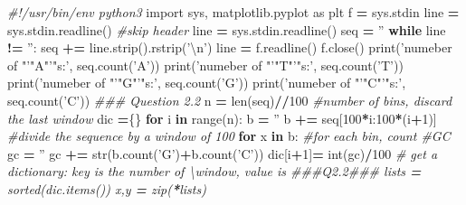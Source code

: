 \documentclass[]{article}
\newenvironment{Shaded}{\begin{snugshade}}{\end{snugshade}}
\newcommand{\KeywordTok}[1]{\textcolor[rgb]{0.13,0.29,0.53}{\textbf{#1}}}
\newcommand{\DecValTok}[1]{\textcolor[rgb]{0.00,0.00,0.81}{#1}}
\newcommand{\CharTok}[1]{\textcolor[rgb]{0.31,0.60,0.02}{#1}}
\newcommand{\StringTok}[1]{\textcolor[rgb]{0.31,0.60,0.02}{#1}}
\newcommand{\ImportTok}[1]{#1}
\newcommand{\CommentTok}[1]{\textcolor[rgb]{0.56,0.35,0.01}{\textit{#1}}}
\newcommand{\ControlFlowTok}[1]{\textcolor[rgb]{0.13,0.29,0.53}{\textbf{#1}}}
\newcommand{\OperatorTok}[1]{\textcolor[rgb]{0.81,0.36,0.00}{\textbf{#1}}}
\newcommand{\BuiltInTok}[1]{#1}
\newcommand{\NormalTok}[1]{#1}
\begin{document}
\begin{Shaded}
\begin{Highlighting}[]
\CommentTok{#!/usr/bin/env python3}
\ImportTok{import}\NormalTok{ sys, matplotlib.pyplot }\ImportTok{as}\NormalTok{ plt}
\NormalTok{f }\OperatorTok{=}\NormalTok{ sys.stdin}
\NormalTok{line }\OperatorTok{=}\NormalTok{ sys.stdin.readline() }\CommentTok{#skip header}
\NormalTok{line }\OperatorTok{=}\NormalTok{ sys.stdin.readline()}
\NormalTok{seq }\OperatorTok{=} \StringTok{''}
\ControlFlowTok{while}\NormalTok{ line }\OperatorTok{!=} \StringTok{''}\NormalTok{:}
\NormalTok{    seq }\OperatorTok{+=}\NormalTok{ line.strip().rstrip(}\StringTok{'}\CharTok{\textbackslash{}n}\StringTok{'}\NormalTok{)}
\NormalTok{    line }\OperatorTok{=}\NormalTok{ f.readline()}
\NormalTok{f.close()}
\BuiltInTok{print}\NormalTok{(}\StringTok{'numeber of "'"A"'"s:'}\NormalTok{, seq.count(}\StringTok{'A'}\NormalTok{))}
\BuiltInTok{print}\NormalTok{(}\StringTok{'numeber of "'"T"'"s:'}\NormalTok{, seq.count(}\StringTok{'T'}\NormalTok{))}
\BuiltInTok{print}\NormalTok{(}\StringTok{'numeber of "'"G"'"s:'}\NormalTok{, seq.count(}\StringTok{'G'}\NormalTok{))}
\BuiltInTok{print}\NormalTok{(}\StringTok{'numeber of "'"C"'"s:'}\NormalTok{, seq.count(}\StringTok{'C'}\NormalTok{))}
\CommentTok{### Question 2.2}
\NormalTok{n }\OperatorTok{=} \BuiltInTok{len}\NormalTok{(seq)}\OperatorTok{//}\DecValTok{100}    \CommentTok{#number of bins, discard the last window   }
\NormalTok{dic }\OperatorTok{=}\NormalTok{\{\}}
\ControlFlowTok{for}\NormalTok{ i }\KeywordTok{in} \BuiltInTok{range}\NormalTok{(n):}
\NormalTok{    b }\OperatorTok{=} \StringTok{''}
\NormalTok{    b }\OperatorTok{+=}\NormalTok{ seq[}\DecValTok{100}\OperatorTok{*}\NormalTok{i:}\DecValTok{100}\OperatorTok{*}\NormalTok{(i}\OperatorTok{+}\DecValTok{1}\NormalTok{)] }\CommentTok{#divide the sequence by a window of 100}
    \ControlFlowTok{for}\NormalTok{ x }\KeywordTok{in}\NormalTok{ b:     }\CommentTok{#for each bin, count #GC}
\NormalTok{        gc }\OperatorTok{=} \StringTok{''}
\NormalTok{        gc }\OperatorTok{+=} \BuiltInTok{str}\NormalTok{(b.count(}\StringTok{'G'}\NormalTok{)}\OperatorTok{+}\NormalTok{b.count(}\StringTok{'C'}\NormalTok{))}
\NormalTok{    dic[i}\OperatorTok{+}\DecValTok{1}\NormalTok{]}\OperatorTok{=} \BuiltInTok{int}\NormalTok{(gc)}\OperatorTok{/}\DecValTok{100}   \CommentTok{# get a dictionary: key is the number of   \textbackslash{}window, value is %GC}
\CommentTok{###Q2.2###}
\NormalTok{lists }\OperatorTok{=} \BuiltInTok{sorted}\NormalTok{(dic.items())}
\NormalTok{x,y }\OperatorTok{=} \BuiltInTok{zip}\NormalTok{(}\OperatorTok{*}\NormalTok{lists)}
}
\end{Highlighting}
\end{Shaded}
\end{document}
